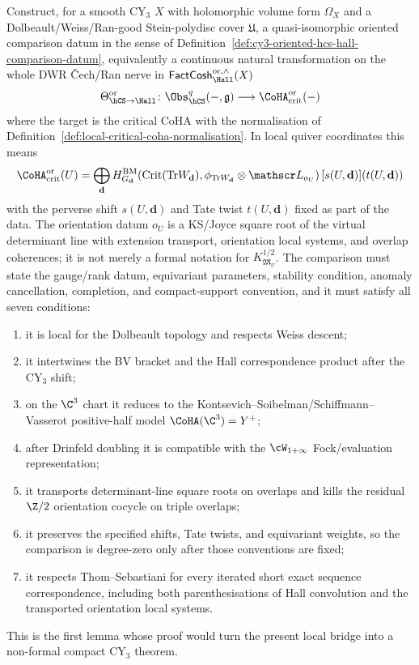 \begin{openproblem}
\label{op:cy3-hcs-hall-comparison}
Construct, for a smooth CY$_3$ $X$ with holomorphic volume form
$\Omega_X$ and a Dolbeault/Weiss/Ran-good Stein-polydisc cover
$\mathfrak U$, a quasi-isomorphic oriented comparison datum in the
sense of Definition~\ref{def:cy3-oriented-hcs-hall-comparison-datum},
equivalently a continuous natural transformation on the whole DWR
\v{C}ech/Ran nerve in
$\mathsf{FactCosh}_{\Hall}^{\mathrm{or},\wedge}(X)$
\[
 \Theta_{\hCS\to\Hall}^{\mathrm{or}}\colon
 \Obs_{\hCS}^{q}(-,\mathfrak g)
 \longrightarrow
 \CoHA_{\mathrm{crit}}^{\mathrm{or}}(-)
\]
where the target is the critical CoHA with the normalisation of
Definition~\ref{def:local-critical-coha-normalisation}. In local quiver
coordinates this means
\[
 \CoHA_{\mathrm{crit}}^{\mathrm{or}}(U)
 =
 \bigoplus_{\mathbf d}
 H^{\mathrm{BM}}_{G_{\mathbf d}}
 \!\left(
	 \mathrm{Crit}(\mathrm{Tr}W_{\mathbf d}),
	 \phi_{\mathrm{Tr}W_{\mathbf d}}\otimes\mathscr L_{o_U}
	 \right)
 [s(U,\mathbf d)](t(U,\mathbf d))
\]
with the perverse shift $s(U,\mathbf d)$ and Tate twist
$t(U,\mathbf d)$ fixed as part of the data. The orientation datum $o_U$
is a KS/Joyce square root of the virtual determinant line with extension
transport, orientation local systems, and overlap coherences; it is not
merely a formal notation for $K_{\mathfrak M_U}^{1/2}$. The comparison
must state the gauge/rank datum, equivariant parameters, stability
condition, anomaly cancellation, completion, and compact-support
convention, and it must satisfy all seven conditions:
\begin{enumerate}
\item it is local for the Dolbeault topology and respects Weiss descent;
\item it intertwines the BV bracket and the Hall correspondence product
after the CY$_3$ shift;
\item on the $\C^3$ chart it reduces to the
Kontsevich--Soibelman/Schiffmann--Vasserot positive-half model
$\CoHA(\C^3)=Y^+$;
\item after Drinfeld doubling it is compatible with the
$\cW_{1+\infty}$ Fock/evaluation representation;
\item it transports determinant-line square roots on overlaps and kills
the residual $\Z/2$ orientation cocycle on triple overlaps;
\item it preserves the specified shifts, Tate twists, and equivariant
weights, so the comparison is degree-zero only after those conventions
are fixed;
\item it respects Thom--Sebastiani for every iterated short exact
sequence correspondence, including both parenthesisations of Hall
convolution and the transported orientation local systems.
\end{enumerate}
This is the first lemma whose proof would turn the present local
bridge into a non-formal compact CY$_3$ theorem.
\end{openproblem}

